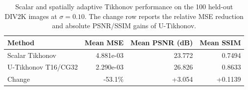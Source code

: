 \begin{table}[htbp]
\centering
\caption{Scalar and spatially adaptive Tikhonov performance on the 100 held-out DIV2K images at $\sigma=0.10$. The change row reports the relative MSE reduction and absolute PSNR/SSIM gains of U-Tikhonov.}
\label{tab:scalar_vs_spatial_tikhonov}
\begin{tabular}{lrrr}
\toprule
Method & Mean MSE & Mean PSNR (dB) & Mean SSIM \\
\midrule
Scalar Tikhonov & 4.881e-03 & 23.772 & 0.7494 \\
U-Tikhonov T16/CG32 & 2.290e-03 & 26.826 & 0.8633 \\
Change & -53.1\% & +3.054 & +0.1139 \\
\bottomrule
\end{tabular}
\end{table}
